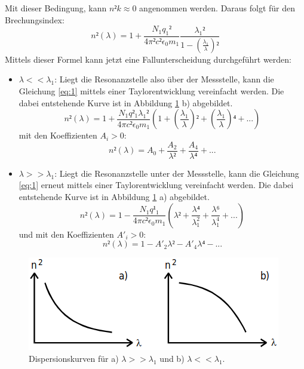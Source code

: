 Mit dieser Bedingung, kann $n²k \approx 0$ angenommen werden. Daraus folgt für den Brechungsindex:
\begin{equation}
  \label{eq:1}
  n²(\lambda)=1+ \frac{N_1 q_1²}{4\pi² c² \epsilon_0 m_1} \frac{\lambda_1²}{{1-\left(\frac{\lambda_1}{\lambda}\right)²}}
\end{equation}
Mittels dieser Formel kann jetzt eine Fallunterscheidung durchgeführt werden:
\begin{itemize}
  \item $\lambda << \lambda_1$: Liegt die Resonanzstelle also über der Messstelle, kann die Gleichung \eqref{eq:1} mittels einer Taylorentwicklung vereinfacht
  werden. Die dabei entstehende Kurve ist in Abbildung \ref{abb:2} b) abgebildet.
  \begin{equation*}
    n²(\lambda) = 1+\frac{N_1 q²_1 \lambda_1²}{4 \pi c² \epsilon_0 m_1} \left(1+\left(\frac{\lambda_1}{\lambda}\right)²+\left(\frac{\lambda_1}{\lambda}\right)⁴+ ...\right)
  \end{equation*}
  mit den Koeffizienten $A_i>0$:
  \begin{equation}
    \label{eq:2}
    n²(\lambda) = A_0 + \frac{A_2}{\lambda²}+\frac{A_4}{\lambda⁴}+...
  \end{equation}
  \item $\lambda >> \lambda_1$: Liegt die Resonanzstelle unter der Messstelle, kann die Gleichung \eqref{eq:1} erneut mittels einer Taylorentwicklung vereinfacht
  werden. Die dabei entstehende Kurve ist in Abbildung \ref{abb:2} a) abgebildet.
  \begin{equation*}
      n²(\lambda) = 1-\frac{N_1 q¹_1}{4 \pi c² \epsilon_0 m_1} \left(\lambda²+\frac{\lambda⁴}{\lambda_1^2}+\frac{\lambda⁶}{\lambda_1^4}+...\right)
  \end{equation*}
  und mit den Koeffizienten $A'_i>0$:
  \begin{equation*}
    n²(\lambda) = 1-A'_2\lambda²-A'_4\lambda⁴-...
  \end{equation*}
\end{itemize}
\FloatBarrier
\begin{figure}
  \centering
  \includegraphics[scale=0.6]{2.png}
  \caption{Dispersionskurven für a) $\lambda >> \lambda_1$ und b) $\lambda << \lambda_1$. \cite{Q1}}
  \label{abb:2}
\end{figure}
\FloatBarrier

